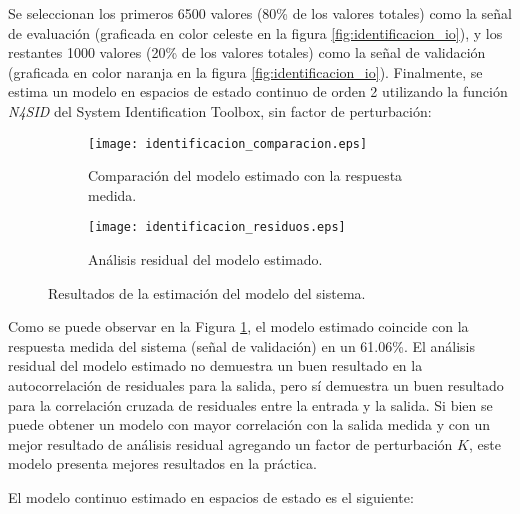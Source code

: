 Se seleccionan los primeros 6500 valores (80\% de los valores totales) como la señal de evaluación
(graficada en color celeste en la figura \ref{fig:identificacion_io}), y los restantes 1000 valores
(20\% de los valores totales) como la señal de validación (graficada en color naranja en la figura \ref{fig:identificacion_io}). Finalmente,
se estima un modelo en espacios de estado continuo de orden 2 utilizando la función \textit{N4SID} del System Identification Toolbox, sin
factor de perturbación:

\begin{figure}[H]
    \centering

    \begin{subfigure}[b]{\textwidth}
        \centering
        \texttt{[image: identificacion\_comparacion.eps]}
        \caption{Comparación del modelo estimado con la respuesta medida.}
        \vspace{0.25cm}
        \label{fig:identificacion_comparacion}
    \end{subfigure}
    \begin{subfigure}[b]{\textwidth}
        \centering
        \texttt{[image: identificacion\_residuos.eps]}
        \caption{Análisis residual del modelo estimado.}
        \label{fig:identificacion_residuos}
    \end{subfigure}

    \vspace{-0.25cm}
    \caption{Resultados de la estimación del modelo del sistema.}
    \label{fig:identificacion_resultados}
\end{figure}
\vspace{-0.5cm}

Como se puede observar en la Figura \ref{fig:identificacion_comparacion}, el modelo estimado coincide
con la respuesta medida del sistema (señal de validación) en un 61.06\%. El análisis residual del modelo estimado
no demuestra un buen resultado en la autocorrelación de residuales para la salida, pero sí demuestra un buen resultado 
para la correlación cruzada de residuales entre la entrada y la salida. Si bien se puede obtener un modelo
con mayor correlación con la salida medida y con un mejor resultado de análisis residual agregando un factor
de perturbación $K$, este modelo presenta mejores resultados en la práctica.

El modelo continuo estimado en espacios de estado es el siguiente:

